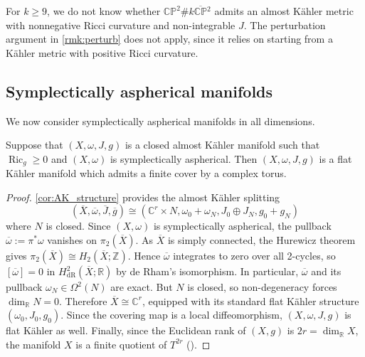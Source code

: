 \documentclass[11pt,twoside]{amsart}
\DeclareMathOperator{\Ric}{Ric}
\newcommand{\Z}{\mathbb{Z}}
\newcommand{\R}{\mathbb{R}}
\newcommand{\C}{\mathbb{C}}
\begin{document}
\begin{remark}
    For $k\geq 9$, we do not know whether $\mathbb{CP}^2\#k\overline{\mathbb{CP}}{}^{2}$ admits an almost K\"ahler metric with nonnegative Ricci curvature and non-integrable $J$. The perturbation argument in \autoref{rmk:perturb} does not apply, since it relies on starting from a K\"ahler metric with positive Ricci curvature.
\end{remark}


    
  
\subsection{Symplectically aspherical manifolds} 
We now consider symplectically aspherical manifolds in all dimensions.
\begin{corollary}
\label{cor:aspherical_nonnegative_is_kahler-flat}
      Suppose that $(X,\omega,J,g)$ is a closed almost K\"ahler manifold such that $\Ric_g\geq 0$ and $(X,\omega)$ is symplectically aspherical. Then $(X,\omega,J,g)$ is a flat K\"ahler manifold which admits a finite cover by a complex torus.
\end{corollary}
\begin{proof}
    \autoref{cor:AK_structure} provides the  almost K\"ahler splitting 
    $$(\overline X,\overline \omega,\overline J, \overline g) \cong (\C^r\times N, \omega_0 + \omega_N, J_0 \oplus J_N, g_{0} + g_N)$$
    where $N$ is closed. Since $(X,\omega)$ is symplectically aspherical, the pullback $\overline\omega:=\pi^*\omega$ vanishes on $\pi_2(\overline X)$. As $\overline X$ is simply connected, the Hurewicz theorem gives \( \pi_2(\overline X)\cong H_2(\overline X;\Z). \) Hence $\overline\omega$ integrates to zero over all 2-cycles, so \( [\overline\omega]=0 \text{ in }H^2_{\mathrm{dR}}(\overline X;\R) \) by de Rham's isomorphism. In particular, $\overline\omega$ and its pullback $\omega_N \in \Omega^2(N)$ are exact. But $N$ is closed, so non-degeneracy forces $\dim_{\R} N=0$. Therefore $\overline X \cong \C^r$, equipped with its standard flat K\"ahler structure $(\omega_0, J_0,g_0)$. Since the covering map is a local diffeomorphism, $(X,\omega,J,g)$ is flat K\"ahler as well. Finally, since the Euclidean rank of $(X,g)$ is  $2r = \dim_\R X$, the manifold $X$ is a finite quotient of $T^{2r}$ (\cite[Corollary 6.67]{Einsteinbook}).
\end{proof}
\end{document}
